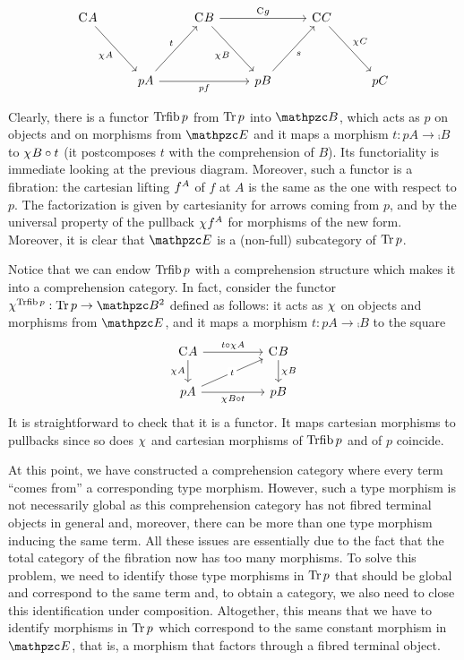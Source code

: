 \documentclass{lmcs} %
\theoremstyle{plain}\newtheorem{satz}[thm]{Satz} %
\begin{document}
\[\begin{tikzcd}
	{\comp{}A} && {\comp{}B} && {\comp{}C} & \\
	\\
	& pA && pB && pC
	\arrow["{\jcomp{}A}"', from=1-1, to=3-2]
	\arrow["{\comp{}g}", from=1-3, to=1-5]
	\arrow["{\jcomp{}B}"', from=1-3, to=3-4]
	\arrow["{\jcomp{}C}", from=1-5, to=3-6]
	\arrow["t", from=3-2, to=1-3]
	\arrow["pf"', from=3-2, to=3-4]
	\arrow["s"', from=3-4, to=1-5]
\end{tikzcd}\]

Clearly, there is a functor $\mathop{\mathrm{Trfib}}\nolimits p$ from $\mathop{\mathrm{Tr}}\nolimits{p}$ into $\ct{B}$, which acts as $p$ on objects and on morphisms from $\ct{E}$ and 
it maps a morphism $t:pA\to\comp{}B$ to $\chi^{}B\circ t$ 
(it postcomposes $t$ with the comprehension of $B$). Its functoriality is immediate looking at the previous diagram.
Moreover, such a functor is a fibration: 
the cartesian lifting $f^{A}$ of $f$ at $A$ is the same as the one with respect to $p$. 
The factorization is given by cartesianity for arrows coming from $p$, and by the universal property of the pullback $\chi^{}f^{A}$ for morphisms of the new form. 
Moreover, it is clear that $\ct{E}$ is a (non-full) subcategory of $\mathop{\mathrm{Tr}}\nolimits{p}$.

Notice that we can endow $\mathop{\mathrm{Trfib}}\nolimits p$ with a comprehension structure which makes it into a comprehension category. In fact, consider the functor $\jcomp{\Trfib{p}}:\Tr{p}\to \Arr{\ct{B}}$ defined as follows: it acts as $\chi^{}$ on objects and morphisms from $\ct{E}$, and it maps a morphism $t:pA\to\comp{}B$ to the square
\[\begin{tikzcd}
	{\comp{}A} && {\comp{}B} \\
	pA && pB
	\arrow["{t\arcmp\jcomp{}A}", from=1-1, to=1-3]
	\arrow["{\jcomp{}A}"', from=1-1, to=2-1]
	\arrow["{\jcomp{}B}", from=1-3, to=2-3]
	\arrow["t"{description}, from=2-1, to=1-3]
	\arrow["{\jcomp{}B\arcmp t}"', from=2-1, to=2-3]
\end{tikzcd}\]
It is straightforward to check that it is a functor. It maps cartesian morphisms to pullbacks since so does $\chi^{}$ and 
cartesian morphisms of $\mathop{\mathrm{Trfib}}\nolimits p$ and of $p$ coincide.

At this point, we have constructed a comprehension category where every term ``comes from'' a corresponding type morphism. 
However, such a type morphism is not necessarily global as this comprehension category has not fibred terminal objects in general and, moreover, 
there can be more than one type morphism inducing the same term. 
All these issues are essentially due to the fact that the total category of the fibration now has too many morphisms.
% 
To solve this problem,  we need to identify those type morphisms in $\mathop{\mathrm{Tr}}\nolimits{p}$ that should be global and correspond to the same term and, 
to obtain a category, we also need to close this identification under composition. 
Altogether, this means that we have to identify morphisms in $\mathop{\mathrm{Tr}}\nolimits{p}$ which correspond to the same constant morphism in $\ct{E}$, that is, a morphism that factors through a fibred terminal object. 
\end{document}
